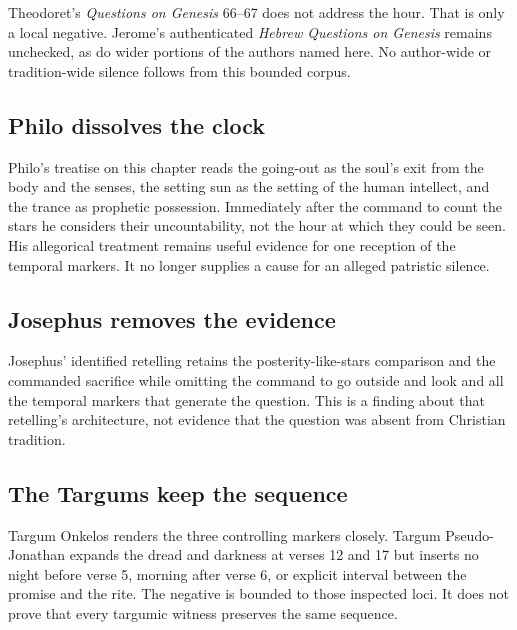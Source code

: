 Theodoret's \textit{Questions on Genesis} 66--67 does not address the hour.
That is only a local negative. Jerome's authenticated \textit{Hebrew Questions
on Genesis} remains unchecked, as do wider portions of the authors named here.
No author-wide or tradition-wide silence follows from this bounded corpus.

\subsection{Philo dissolves the clock}

Philo's treatise on this chapter reads the going-out as the soul's exit from
the body and the senses, the setting sun as the setting of the human intellect,
and the trance as prophetic possession. Immediately after the command to count
the stars he considers their uncountability, not the hour at which they could
be seen. His allegorical treatment remains useful evidence for
one reception of the temporal markers. It no longer supplies a cause for an
alleged patristic silence.

\subsection{Josephus removes the evidence}

Josephus' identified retelling retains the posterity-like-stars comparison and
the commanded sacrifice while omitting the command to go outside and look and
all the temporal markers that generate the question. This is a finding about that retelling's architecture,
not evidence that the question was absent from Christian tradition.

\subsection{The Targums keep the sequence}

Targum Onkelos renders the three controlling markers closely. Targum
Pseudo-Jonathan expands the dread and darkness at verses 12 and 17 but inserts
no night before verse 5, morning after verse 6, or explicit interval between
the promise and the rite. The negative is bounded to
those inspected loci. It does not prove that every targumic witness preserves
the same sequence.

